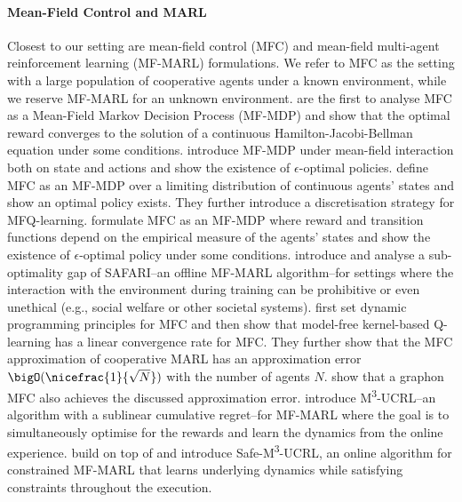 \paragraph{Mean-Field Control and MARL}
Closest to our setting are mean-field control (MFC) and mean-field multi-agent reinforcement learning (MF-MARL) formulations. We refer to MFC as the setting with a large population of cooperative agents under a known environment, while we reserve MF-MARL for an unknown environment.
\citet{gast2012mean} are the first to analyse MFC as a Mean-Field Markov Decision Process (MF-MDP) and show that the optimal reward converges to the solution of a continuous Hamilton-Jacobi-Bellman equation under some conditions.
\citet{Motte2019Mean-fieldControls} introduce MF-MDP under mean-field interaction both on state and actions and show the existence of $\epsilon$-optimal policies. 
\citet{carmona2019model} define MFC as an MF-MDP  over a limiting distribution of continuous agents' states and show an optimal policy exists. They further introduce a discretisation strategy for MFQ-learning.  
\citet{Bauerle2021MeanProcesses} formulate MFC as an MF-MDP where reward and transition functions depend on the empirical measure of the agents' states and show the existence of $\epsilon$-optimal policy under some conditions. 
\citet{chen2021pessimism} introduce and analyse a sub-optimality gap of SAFARI--an offline MF-MARL algorithm--for settings where the interaction with the environment during training can be prohibitive or even unethical (e.g., social welfare or other societal systems).
\citet{Gu2019DynamicMFCs,Gu2021Mean-FieldAnalysis} first set dynamic programming principles for MFC and then show that model-free kernel-based Q-learning has a linear convergence rate for MFC. They further show that the MFC approximation of cooperative MARL has an approximation error $\bigO(\nicefrac{1}{\sqrt{N}})$ with the number of agents $N$. \citet{hu2023graphon} show that a graphon MFC also achieves the discussed approximation error. 
\citet{pasztor2021efficient} introduce M\textsuperscript{3}-UCRL--an algorithm with a sublinear cumulative regret--for MF-MARL where the goal is to simultaneously optimise for the rewards and learn the dynamics from the online experience.
\citet{jusup2023safe} build on top of \citet{pasztor2021efficient} and introduce Safe-M\textsuperscript{3}-UCRL, an online algorithm for constrained MF-MARL that learns underlying dynamics while satisfying constraints throughout the execution. 